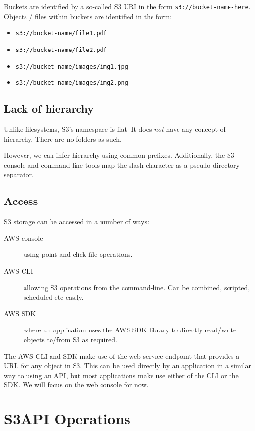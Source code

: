 Buckets are identified by a so-called S3 URI in the form \texttt{s3://bucket-name-here}.
Objects / files within buckets are identified in the form:

\begin{itemize}
\item
  \texttt{s3://bucket-name/file1.pdf}
\item
  \texttt{s3://bucket-name/file2.pdf}
\item
  \texttt{s3://bucket-name/images/img1.jpg}
\item
  \texttt{s3://bucket-name/images/img2.png}
\end{itemize}

\subsection{Lack of hierarchy}\label{lack-of-hierarchy}

Unlike filesystems, S3's namespace is flat.
It does \emph{not} have any concept of hierarchy.
There are no folders as such.

However, we can infer hierarchy using common prefixes.
Additionally, the S3 console and command-line tools map the slash character as a pseudo directory separator.

\subsection{Access}\label{access}

S3 storage can be accessed in a number of ways:

\begin{description}
\item[AWS console]
  using point-and-click file operations.
\item[AWS CLI]
  allowing S3 operations from the command-line. Can be combined, scripted,
scheduled etc easily.
\item[AWS SDK]
  where an application uses the AWS SDK library to directly read/write objects to/from S3 as required.
\end{description}

The AWS CLI and SDK make use of the web-service endpoint that provides a URL for any object in S3.
This can be used directly by an application in a similar way to using an API, but most applications make use either of the CLI or the SDK.
We will focus on the web console for now.

\section{S3API Operations}
\label{s3api-operations}

